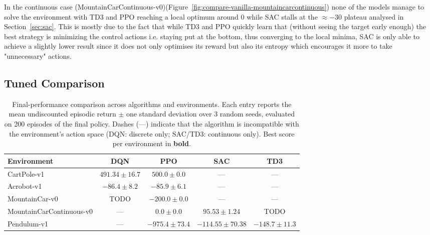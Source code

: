 \documentclass{article}
\begin{document}
In the continuous case (MountainCarContinuous-v0)(Figure~\ref{fig:compare-vanilla-mountaincarcontinuous}) none of the models manage to solve the environment with TD3 and PPO reaching a local optimum around 0 while SAC stalls at the $\approx-30$ plateau analysed in Section~\ref{sec:sac}. This is mostly due to the fact that while TD3 and PPO quickly learn that (without seeing the target early enough) the best strategy is minimizing the control actions i.e. staying put at the bottom, thus converging to the local minima, SAC is only able to achieve a slightly lower result since it does not only optimises its reward but also its entropy which encourages it more to take "unnecessary" actions.

\subsection{Tuned Comparison}

\begin{table}[H]
  \caption{Final-performance comparison across algorithms and environments. Each entry reports the mean undiscounted episodic return $\pm$ one standard deviation over 3 random seeds, evaluated on 200 episodes of the final policy. Dashes (---) indicate that the algorithm is incompatible with the environment's action space (DQN: discrete only; SAC/TD3: continuous only). Best score per environment in \textbf{bold}.}
  \label{tab:results}
  \centering
  \small
  \begin{tabular}{lcccc}
    \toprule
    Environment & DQN & PPO & SAC & TD3 \\
    \midrule
    CartPole-v1               & $491.34 \pm 16.7$         & $\mathbf{500.0 \pm 0.0}$  & ---                       & ---               \\
    Acrobot-v1                & $-86.4 \pm 8.2$          & $\mathbf-85.9 \pm 6.1$  & ---                       & ---               \\
    MountainCar-v0            & TODO & $-200.0 \pm 0.0$        & ---                       & ---               \\
    MountainCarContinuous-v0  & ---                      & $0.0 \pm 0.0$            & $\mathbf{95.53 \pm 1.24}$  & TODO    \\
    Pendulum-v1               & ---                      & $-975.4 \pm 73.4$         & $\mathbf{-114.55 \pm 70.38}$ & $-148.7 \pm 11.3$ \\
    \bottomrule
  \end{tabular}
\end{table}
\end{document}
